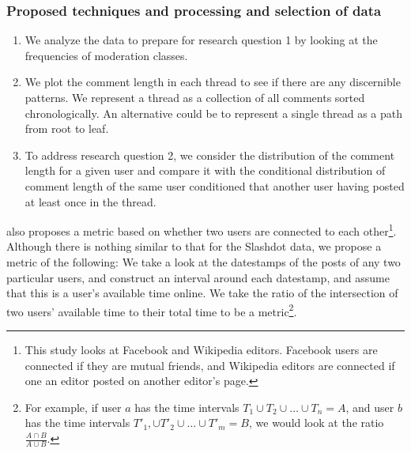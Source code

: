 \documentclass[a4paper,12pt]{article}
\numberwithin{equation}{section}
\begin{document}



\subsubsection*{Proposed techniques and processing and selection of data}
\begin{enumerate}
\item We analyze the data to prepare for research question 1 by looking at the frequencies of moderation classes. 

\item We plot the comment length in each thread to see if there are any discernible patterns. We represent a thread as a collection of all comments sorted chronologically. An alternative could be to represent a single thread as a path from root to leaf. 

\item To address research question 2, we consider the distribution of the comment length for a given user and compare it with the conditional distribution of comment length of the same user conditioned that another user having posted at least once in the thread. 
\end{enumerate}




\cite{Backstrom+al:13a} also proposes a metric based on whether two users are connected to each other\footnote{This study looks at Facebook and Wikipedia editors. Facebook users are connected if they are mutual friends, and Wikipedia editors are connected if one an editor posted on another editor's page.}. Although there is nothing similar to that for the Slashdot data, we propose a metric of the following: We take a look at the datestamps of the posts of any two particular users, and construct an interval around each datestamp, and assume that this is a user's available time online. We take the ratio of the intersection of two users' available time to their total time to be a metric\footnote{For example, if user $a$ has the time intervals $T_1 \cup T_2 \cup \hdots \cup T_n = A$, and user $b$ has the time intervals $T'_1, \cup T'_2 \cup \hdots \cup T'_m = B$, we would look at the ratio $\frac{A \cap B}{A \cup B}$. }. 
\end{document}
